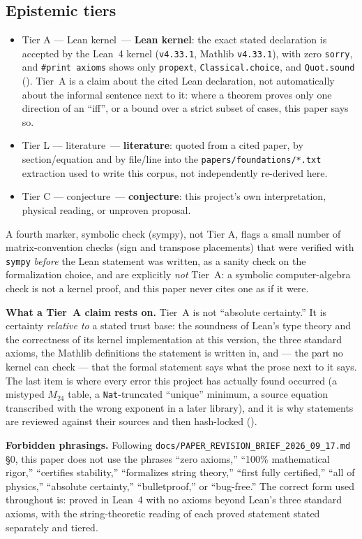 \documentclass[11pt,a4paper]{article}
\theoremstyle{remark}
\newcommand{\tierA}{\colorbox{green!15}{\textsf{\scriptsize Tier A --- Lean kernel}}}
\newcommand{\tierL}{\colorbox{blue!10}{\textsf{\scriptsize Tier L --- literature}}}
\newcommand{\tierC}{\colorbox{orange!15}{\textsf{\scriptsize Tier C --- conjecture}}}
\newcommand{\tierS}{\colorbox{gray!15}{\textsf{\scriptsize symbolic check (sympy), not Tier A}}}
\begin{document}
\subsection{Epistemic tiers}
\label{sec:tiers}
\begin{itemize}
  \item \tierA\ --- \textbf{Lean kernel}: the exact stated declaration is accepted by the Lean~4
    kernel (\texttt{v4.33.1}, Mathlib \texttt{v4.33.1}), with zero \texttt{sorry}, and
    \texttt{\#print axioms} shows only \texttt{propext}, \texttt{Classical.choice}, and
    \texttt{Quot.sound} (). Tier~A is a claim about the cited Lean declaration,
    not automatically about the informal sentence next to it: where a theorem proves only one
    direction of an ``iff'', or a bound over a strict subset of cases, this paper says so.
  \item \tierL\ --- \textbf{literature}: quoted from a cited paper, by section/equation and by
    file/line into the \texttt{papers/foundations/*.txt} extraction used to write this
    corpus, not independently re-derived here.
  \item \tierC\ --- \textbf{conjecture}: this project's own interpretation, physical reading, or
    unproven proposal.
\end{itemize}
A fourth marker, \tierS, flags a small number of matrix-convention checks (sign and transpose
placements) that were verified with \texttt{sympy} \emph{before} the Lean statement was written,
as a sanity check on the formalization choice, and are explicitly \emph{not} Tier~A: a symbolic
computer-algebra check is not a kernel proof, and this paper never cites one as if it were.

\textbf{What a Tier~A claim rests on.} Tier~A is not ``absolute certainty.'' It is certainty
\emph{relative to} a stated trust base: the soundness of Lean's type theory and the correctness of
its kernel implementation at this version, the three standard axioms, the Mathlib definitions the
statement is written in, and --- the part no kernel can check --- that the formal statement says what
the prose next to it says. The last item is where every error this project has actually found
occurred (a mistyped $M_{24}$ table, a \texttt{Nat}-truncated ``unique'' minimum, a source equation
transcribed with the wrong exponent in a later library), and it is why statements are reviewed
against their sources and then hash-locked ().

\textbf{Forbidden phrasings.} Following \texttt{docs/PAPER\_REVISION\_BRIEF\_2026\_09\_17.md} \S0,
this paper does not use the phrases ``zero axioms,'' ``100\% mathematical rigor,'' ``certifies
stability,'' ``formalizes string theory,'' ``first fully certified,'' ``all of physics,''
``absolute certainty,'' ``bulletproof,'' or ``bug-free.'' The
correct form used throughout is: proved in Lean~4 with no axioms beyond Lean's three standard
axioms, with the string-theoretic reading of each proved statement stated separately and tiered.
\end{document}
